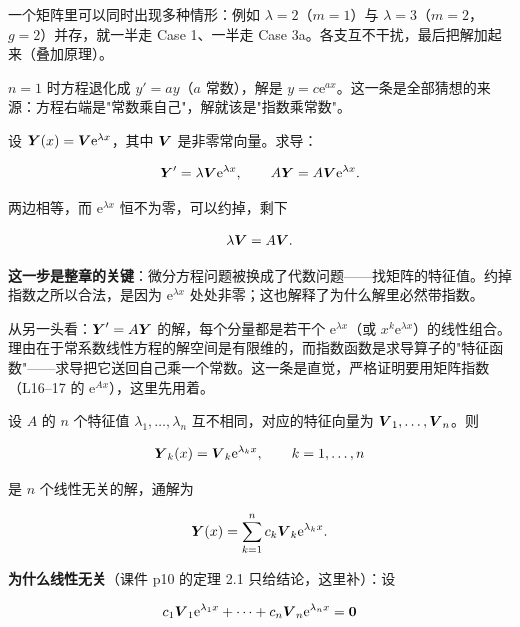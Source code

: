 \documentclass[11pt]{ctexart}
\begin{document}
一个矩阵里可以同时出现多种情形：例如 $\lambda=2$（$m=1$）与 $\lambda=3$（$m=2$，$g=2$）并存，就一半走 Case 1、一半走 Case 3a。各支互不干扰，最后把解加起来（叠加原理）。



$n=1$ 时方程退化成 $y'=ay$（$a$ 常数），解是 $y=c\mathrm{e}^{ax}$。这一条是全部猜想的来源：方程右端是"常数乘自己"，解就该是"指数乘常数"。


设 $\boldsymbol{Y}(x)=\boldsymbol{V}\mathrm{e}^{\lambda x}$，其中 $\boldsymbol{V}$ 是非零常向量。求导：

\[
\boldsymbol{Y}'=\lambda\boldsymbol{V}\mathrm{e}^{\lambda x},\qquad
A\boldsymbol{Y}=A\boldsymbol{V}\mathrm{e}^{\lambda x}.
\]

两边相等，而 $\mathrm{e}^{\lambda x}$ 恒不为零，可以约掉，剩下

\[
\lambda\boldsymbol{V}=A\boldsymbol{V}.
\]

\textbf{这一步是整章的关键}：微分方程问题被换成了代数问题——找矩阵的特征值。约掉指数之所以合法，是因为 $\mathrm{e}^{\lambda x}$ 处处非零；这也解释了为什么解里必然带指数。


从另一头看：$\boldsymbol{Y}'=A\boldsymbol{Y}$ 的解，每个分量都是若干个 $\mathrm{e}^{\lambda x}$（或 $x^k\mathrm{e}^{\lambda x}$）的线性组合。理由在于常系数线性方程的解空间是有限维的，而指数函数是求导算子的"特征函数"——求导把它送回自己乘一个常数。这一条是直觉，严格证明要用矩阵指数（L16--17 的 $\mathrm{e}^{Ax}$），这里先用着。



设 $A$ 的 $n$ 个特征值 $\lambda_1,\dots,\lambda_n$ 互不相同，对应的特征向量为 $\boldsymbol{V}_1,\dots,\boldsymbol{V}_n$。则

\[
\boldsymbol{Y}_k(x)=\boldsymbol{V}_k\mathrm{e}^{\lambda_k x},\qquad k=1,\dots,n
\]

是 $n$ 个线性无关的解，通解为

\[
\boldsymbol{Y}(x)=\sum_{k=1}^{n}c_k\boldsymbol{V}_k\mathrm{e}^{\lambda_k x}.
\]

\textbf{为什么线性无关}（课件 p10 的定理 2.1 只给结论，这里补）：设

\[
c_1\boldsymbol{V}_1\mathrm{e}^{\lambda_1x}+\cdots+c_n\boldsymbol{V}_n\mathrm{e}^{\lambda_nx}=\boldsymbol{0}
\]
\end{document}
